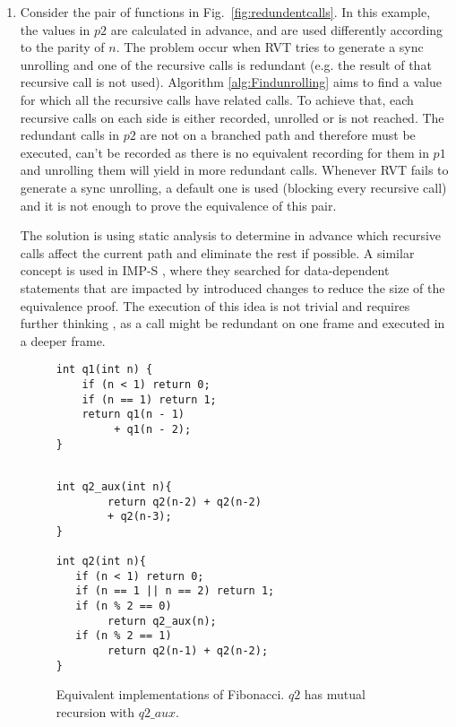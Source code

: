 \begin{enumerate}
\item Consider the pair of functions in Fig.~\ref{fig:redundentcalls}. In this example, the values in $p2$ are calculated in advance, and are used differently according to the parity of $n$. The problem occur when RVT tries to generate a sync unrolling and one of the recursive calls is redundant (e.g. the result of that recursive call is not used). Algorithm \ref{alg:Findunrolling} aims to find a value for which all the recursive calls have related calls. To achieve that, each recursive calls on each side is either recorded, unrolled or is not reached. The redundant calls in $p2$ are not on a branched path and therefore must be executed, can't be recorded as there is no equivalent recording for them in $p1$ and unrolling them will yield in more redundant calls. Whenever RVT fails to generate a sync unrolling, a default one is used (blocking every recursive call) and it is not enough to prove the equivalence of this pair.

The solution is using static analysis to determine in advance which recursive calls affect the current path and eliminate the rest if possible. A similar concept is used in IMP-S \cite{inproceedings}, where they searched for data-dependent statements that are impacted by introduced changes to reduce the size of the equivalence proof. The execution of this idea is not trivial and requires further thinking  , as a call might be redundant on one frame and executed in a deeper frame.

\begin{figure}[h]
\begin{center}
\begin{minipage}{7 cm}
\begin{lstlisting}
int q1(int n) {
    if (n < 1) return 0;
    if (n == 1) return 1;
    return q1(n - 1) 
         + q1(n - 2);
}
\end{lstlisting}
\end{minipage}
\begin{minipage}{7 cm}
\begin{lstlisting}

int q2_aux(int n){
        return q2(n-2) + q2(n-2)
        + q2(n-3);
}

int q2(int n){
   if (n < 1) return 0;
   if (n == 1 || n == 2) return 1; 
   if (n % 2 == 0)
        return q2_aux(n);
   if (n % 2 == 1)
        return q2(n-1) + q2(n-2);
}
\end{lstlisting}
\end{minipage}
\caption{Equivalent implementations of Fibonacci. $q2$ has mutual recursion with $q2\_aux$.}
\label{fig:mutualrecursion}
\end{center}
\end{figure}


\end{enumerate}
